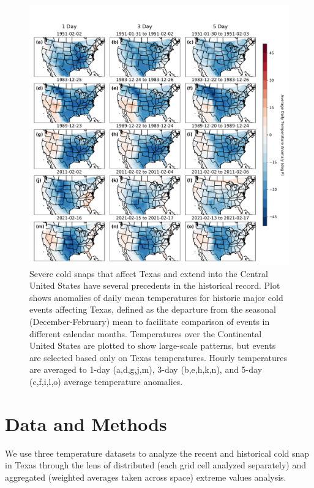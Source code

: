 \documentclass[12pt]{iopart}
\begin{document}
\begin{figure}
  \centering
  \includegraphics[width=\textwidth]{historic_events_era5.pdf}
  \caption{
    Severe cold snaps that affect Texas and extend into the Central United States have several precedents in the historical record.
    Plot shows anomalies of daily mean temperatures for historic major cold events affecting Texas, defined as the departure from the seasonal (December-February) mean to facilitate comparison of events in different calendar months.
    Temperatures over the Continental United States are plotted to show large-scale patterns, but events are selected based only on Texas temperatures.
    Hourly temperatures are averaged to 1-day (a,d,g,j,m), 3-day (b,e,h,k,n), and 5-day (c,f,i,l,o) average temperature anomalies.
  }\label{fig:historic_era5}
\end{figure}

\section{Data and Methods}

We use three temperature datasets to analyze the recent and historical cold snap in Texas through the lens of distributed (each grid cell analyzed separately) and aggregated (weighted averages taken across space) extreme values analysis.
\end{document}
